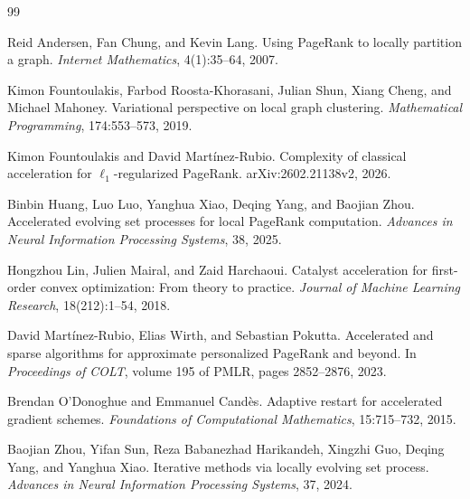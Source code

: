 \begin{thebibliography}{99}

Reid Andersen, Fan Chung, and Kevin Lang.
\newblock Using PageRank to locally partition a graph.
\newblock \emph{Internet Mathematics}, 4(1):35--64, 2007.

Kimon Fountoulakis, Farbod Roosta-Khorasani, Julian Shun, Xiang Cheng, and
Michael Mahoney.
\newblock Variational perspective on local graph clustering.
\newblock \emph{Mathematical Programming}, 174:553--573, 2019.

Kimon Fountoulakis and David Martínez-Rubio.
\newblock Complexity of classical acceleration for
$\ell_1$-regularized PageRank.
\newblock arXiv:2602.21138v2, 2026.

Binbin Huang, Luo Luo, Yanghua Xiao, Deqing Yang, and Baojian Zhou.
\newblock Accelerated evolving set processes for local PageRank computation.
\newblock \emph{Advances in Neural Information Processing Systems}, 38, 2025.

Hongzhou Lin, Julien Mairal, and Zaid Harchaoui.
\newblock Catalyst acceleration for first-order convex optimization: From
theory to practice.
\newblock \emph{Journal of Machine Learning Research}, 18(212):1--54, 2018.

David Martínez-Rubio, Elias Wirth, and Sebastian Pokutta.
\newblock Accelerated and sparse algorithms for approximate personalized
PageRank and beyond.
\newblock In \emph{Proceedings of COLT}, volume 195 of PMLR, pages
2852--2876, 2023.

Brendan O'Donoghue and Emmanuel Candès.
\newblock Adaptive restart for accelerated gradient schemes.
\newblock \emph{Foundations of Computational Mathematics}, 15:715--732, 2015.

Baojian Zhou, Yifan Sun, Reza Babanezhad Harikandeh, Xingzhi Guo, Deqing Yang,
and Yanghua Xiao.
\newblock Iterative methods via locally evolving set process.
\newblock \emph{Advances in Neural Information Processing Systems}, 37, 2024.

\end{thebibliography}
